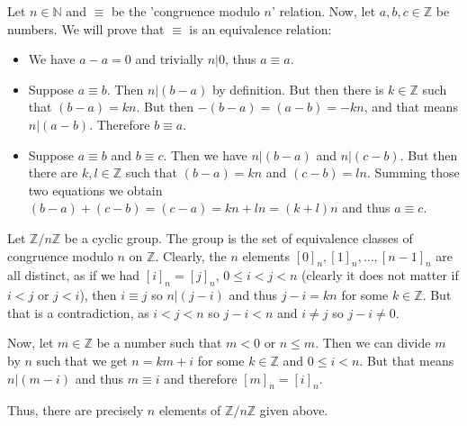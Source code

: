 \begin{solution}
\end{solution}

\begin{problem}
\end{problem}

\begin{solution}
	Let $n\in\mathbb{N}$ and $\equiv$ be the 'congruence modulo $n$' relation. Now, let $a,b,c \in \mathbb{Z}$ be numbers. We will prove that $\equiv$ is an equivalence relation:
	\begin{itemize}
		\item We have $a-a=0$ and trivially $n | 0$, thus $a \equiv a$.
		\item Suppose $a \equiv b$. Then $n | (b - a)$ by definition. But then there is $k \in \mathbb{Z}$ such that $(b - a) = kn$. But then $-(b - a) = (a - b) = -kn$, and that means $n | (a - b)$. Therefore $b \equiv a$.
		\item Suppose $a \equiv b$ and $b \equiv c$. Then we have $n | (b - a)$ and $n | (c - b)$. But then there are $k,l \in \mathbb{Z}$ such that $(b - a) = kn$ and $(c - b) = ln$. Summing those two equations we obtain $(b - a) + (c - b) = (c - a) = kn + ln = (k + l)n$ and thus $a \equiv c$.
	\end{itemize}
\end{solution}

\begin{problem}
\end{problem}

\begin{solution}
	Let $\mathbb{Z}/n\mathbb{Z}$ be a cyclic group. The group is the set of equivalence classes of congruence modulo $n$ on $\mathbb{Z}$. Clearly, the $n$ elements $[0]_n,[1]_n,\dots,[n-1]_n$ are all distinct, as if we had $[i]_n = [j]_n$, $0 \leq i < j < n$ (clearly it does not matter if $i < j$ or $j < i$), then $i \equiv j$ so $n | (j - i)$ and thus $j - i = kn$ for some $k \in \mathbb{Z}$. But that is a contradiction, as $i < j < n$ so $j - i < n$ and $i \neq j$ so $j - i \neq 0$.
	
	Now, let $m \in \mathbb{Z}$ be a number such that $m < 0$ or $n \leq m$. Then we can divide $m$ by $n$ such that we get $n = km + i$ for some $k \in \mathbb{Z}$ and $0 \leq i < n$. But that means $n | (m - i)$ and thus $m \equiv i$ and therefore $[m]_n = [i]_n$.
	
	Thus, there are precisely $n$ elements of $\mathbb{Z}/n\mathbb{Z}$ given above.
\end{solution}

